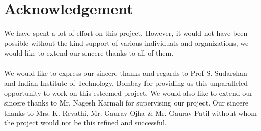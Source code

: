 \documentclass[12pt]{report}
\begin{document}
	\listoftables
	
	\pagebreak
	
	\tableofcontents
	
	\pagebreak
	
	\setcounter{page}{1}
\section{Acknowledgement}
We have spent a lot of effort on this project. However, it would not have been possible without the kind support of various individuals and organizations, we would like to extend our sincere thanks to all of them.
\\
\\
We would like to express our sincere thanks and regards to Prof S. Sudarshan and Indian Institute of Technology, Bombay for providing us this unparalleled opportunity to work on this esteemed project. We would also like to extend our sincere thanks to Mr. Nagesh Karmali for supervising our project. Our sincere thanks to Mrs. K. Revathi, Mr. Gaurav Ojha \& Mr. Gaurav Patil without whom the project would not be this refined and successful.
\\ 
\\

\pagebreak

\end{document}
